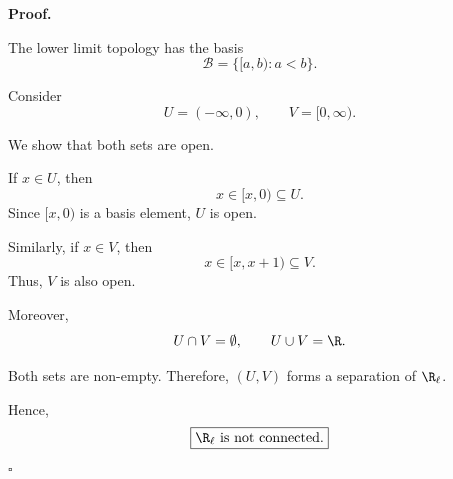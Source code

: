 
\textbf{Proof.}

The lower limit topology has the basis
\[ \mathcal{B}=\{[a,b):a<b\}. \]

Consider
\[ U=(-\infty,0),\qquad V=[0,\infty). \]

We show that both sets are open.

If $x\in U$, then
\[ x\in[x,0)\subseteq U. \]
Since $[x,0)$ is a basis element, $U$ is open.

Similarly, if $x\in V$, then
\[ x\in[x,x+1)\subseteq V. \]
Thus, $V$ is also open.

Moreover,
\[ U\cap V=\emptyset,\qquad U\cup V=\R. \]

Both sets are non-empty. Therefore, $(U,V)$ forms a separation of $\R_{\ell}$.

Hence,
\[ \boxed{\R_{\ell}\text{ is not connected.}} \]
\hfill $\square$
